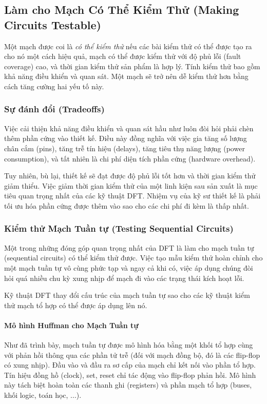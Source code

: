 \subsection{Làm cho Mạch Có Thể Kiểm Thử (Making Circuits Testable)}
Một mạch được coi là \textit{có thể kiểm thử} nếu các bài kiểm thử có thể được tạo ra cho nó một cách hiệu quả, mạch có thể được kiểm thử với độ phủ lỗi (fault coverage) cao, và thời gian kiểm thử sản phẩm là hợp lý. Tính kiểm thử bao gồm khả năng điều khiển và quan sát. Một mạch sẽ trở nên dễ kiểm thử hơn bằng cách tăng cường hai yếu tố này.

\subsubsection{Sự đánh đổi (Tradeoffs)}
Việc cải thiện khả năng điều khiển và quan sát hầu như luôn đòi hỏi phải chèn thêm phần cứng vào thiết kế. Điều này đồng nghĩa với việc gia tăng số lượng chân cắm (pins), tăng trễ tín hiệu (delays), tăng tiêu thụ năng lượng (power consumption), và tất nhiên là chi phí diện tích phần cứng (hardware overhead). 

Tuy nhiên, bù lại, thiết kế sẽ đạt được độ phủ lỗi tốt hơn và thời gian kiểm thử giảm thiểu. Việc giảm thời gian kiểm thử của một linh kiện sau sản xuất là mục tiêu quan trọng nhất của các kỹ thuật DFT. Nhiệm vụ của kỹ sư thiết kế là phải tối ưu hóa phần cứng được thêm vào sao cho các chi phí đi kèm là thấp nhất.

\subsubsection{Kiểm thử Mạch Tuần tự (Testing Sequential Circuits)}
Một trong những đóng góp quan trọng nhất của DFT là làm cho mạch tuần tự (sequential circuits) có thể kiểm thử được. Việc tạo mẫu kiểm thử hoàn chỉnh cho một mạch tuần tự vô cùng phức tạp và ngay cả khi có, việc áp dụng chúng đòi hỏi quá nhiều chu kỳ xung nhịp để mạch đi vào các trạng thái kích hoạt lỗi.

Kỹ thuật DFT thay đổi cấu trúc của mạch tuần tự sao cho các kỹ thuật kiểm thử mạch tổ hợp có thể được áp dụng lên nó.  

\paragraph{Mô hình Huffman cho Mạch Tuần tự}
Như đã trình bày, mạch tuần tự được mô hình hóa bằng một khối tổ hợp cùng với phản hồi thông qua các phần tử trễ (đối với mạch đồng bộ, đó là các flip-flop có xung nhịp). Đầu vào và đầu ra sơ cấp của mạch chỉ kết nối vào phần tổ hợp. Tín hiệu đồng hồ (clock), set, reset chỉ tác động vào flip-flop phản hồi. Mô hình này tách biệt hoàn toàn các thanh ghi (registers) và phần mạch tổ hợp (buses, khối logic, toán học, ...).

